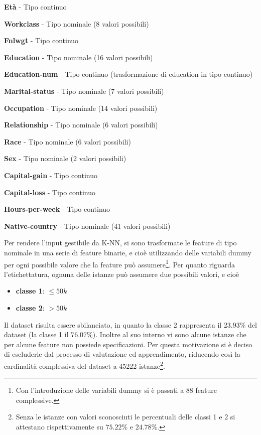 \documentclass[fleqn,10pt]{SelfArx} %
\begin{document}
\begin{itemize}
\footnotesize{
\item \textbf{Età} - Tipo continuo
\item \textbf{Workclass} - Tipo nominale (8 valori possibili)
\item \textbf{Fnlwgt} - Tipo continuo
\item \textbf{Education} - Tipo nominale (16 valori possibili)
\item \textbf{Education-num} - Tipo continuo (trasformazione di education in tipo continuo)
\item \textbf{Marital-status} - Tipo nominale (7 valori possibili)
\item \textbf{Occupation} - Tipo nominale (14 valori possibili)
\item \textbf{Relationship} - Tipo nominale (6 valori possibili)
\item \textbf{Race} - Tipo nominale (6 valori possibili)
\item \textbf{Sex} - Tipo nominale (2 valori possibili)
\item \textbf{Capital-gain} - Tipo continuo 
\item \textbf{Capital-loss} - Tipo continuo
\item \textbf{Hours-per-week} - Tipo continuo
\item \textbf{Native-country} - Tipo nominale (41 valori possibili)}
\end{itemize}
Per rendere l'input gestibile da K-NN, si sono trasformate le feature di tipo nominale in una serie di feature binarie, e cioè utilizzando delle variabili dummy per ogni possibile valore che la feature può assumere\footnote{\footnotesize{Con l'introduzione delle variabili dummy si è passati a 88 feature complessive.}}.
\newline
Per quanto riguarda l'etichettatura, ognuna delle istanze può assumere due possibili valori, e cioè
\begin{itemize}
\item \textbf{classe 1}: $\le50k$
\item \textbf{classe 2}: $>50k$ 
\end{itemize} 

Il dataset risulta essere sbilanciato, in quanto la classe 2 rappresenta il $23.93\% $ del dataset (la classe 1 il $76.07\% $). Inoltre al suo interno vi sono alcune istanze che per alcune feature non possiede specificazioni. Per questa motivazione si è deciso di escluderle dal processo di valutazione ed apprendimento, riducendo così la cardinalità complessiva del dataset a 45222 istanze\footnote{\footnotesize{Senza le istanze con valori sconosciuti le percentuali delle classi 1 e 2 si attestano rispettivamente su $75.22\%$ e $24.78\%$.}}. 
\end{document}
